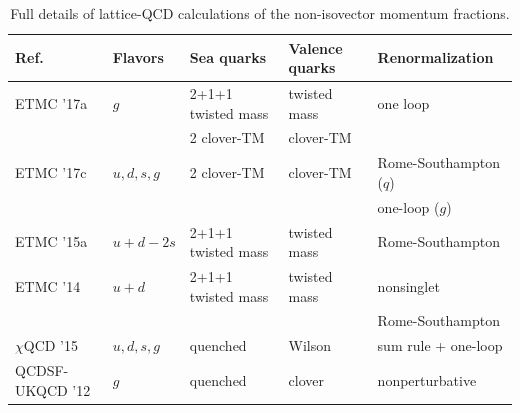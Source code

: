 \begin{table}[!t]
\renewcommand{\arraystretch}{1.2} 
\centering
\footnotesize
\begin{threeparttable}
\begin{tabular}{lllll}
\toprule
Ref. & Flavors & Sea quarks & Valence quarks & Renormalization \\
\midrule

  ETMC '17a \cite{Alexandrou:2016ekb} & $g$
    & 2+1+1 twisted mass & twisted mass & one loop \\
  & & 2 clover-TM & clover-TM & \\

  ETMC '17c \cite{Alexandrou:2017oeh} & $u,d,s,g$
    & 2 clover-TM & clover-TM & Rome-Southampton ($q$)\\
    & & & & one-loop ($g$)\\   
 
  ETMC '15a \cite{Alexandrou:2015qia} &
  $u+d-2s$ &  2+1+1 twisted mass & twisted mass & Rome-Southampton \\

  ETMC '14 \cite{Abdel-Rehim:2013wlz} &
  $u+d$ & 2+1+1 twisted mass & twisted mass & nonsinglet\\ 
  & & & & Rome-Southampton\\

  $\chi$QCD '15 \cite{Deka:2013zha} &
  $u,d,s,g$ & quenched & Wilson & sum rule + one-loop \\

  QCDSF-UKQCD '12 \cite{Horsley:2012pz} &
  $g$ & quenched & clover & nonperturbative \\
\bottomrule
\end{tabular}
\end{threeparttable}
\caption{\small Full details of lattice-QCD calculations of the non-isovector 
momentum fractions.}
\label{tab:nonisovectormomfrac}
\end{table}

